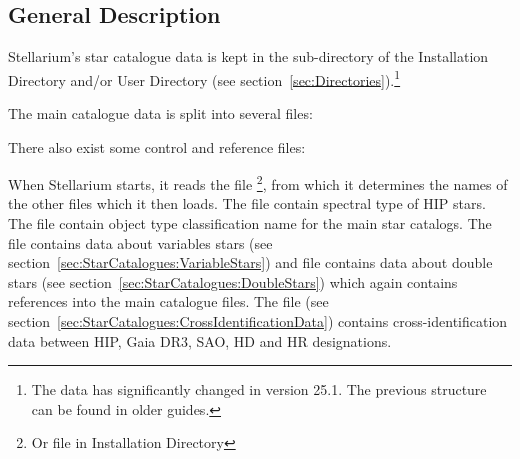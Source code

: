 \subsection{General Description}%
\label{sec:Catalogues:stars:general}

Stellarium's star catalogue data is kept in the 
sub-directory of the Installation Directory and/or User Directory (see
section~\ref{sec:Directories}).\footnote{The data has significantly changed in version 25.1. The previous structure can be found in older guides.}

The main catalogue data is split into several files:

\begin{description}
\item[]
\item[]
\item[]
\item[]
\item[]
\item[]
\item[]
\item[]
\item[]
\end{description}

There also exist some control and reference files:

\begin{description}
\item[]
\item[]
\item[]
\item[]
\item[]
\item[]
\item[]
\end{description}

When Stellarium starts, it reads the file %
\footnote{Or  file in Installation Directory}, from which it determines the 
names of the other files which it then loads. The file  
contain spectral type of HIP stars. The file  
contain object type classification name for the main star catalogs. 
The file  contains data about variables stars
(see section~\ref{sec:StarCatalogues:VariableStars}) and file  
contains data about double stars (see section~\ref{sec:StarCatalogues:DoubleStars}) 
which again contains references into the main catalogue files.
The file  (see section~\ref{sec:StarCatalogues:CrossIdentificationData}) contains cross-identification data between HIP, Gaia DR3, SAO, HD and HR designations.

